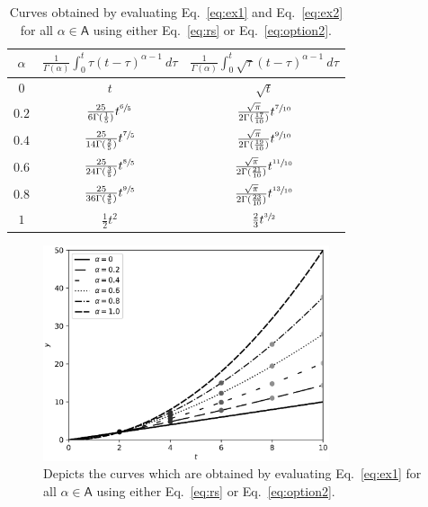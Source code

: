 \documentclass{article}
\theoremstyle{theorem}
\theoremstyle{definition}
\begin{document}
\begin{table}[h!]
\centering
\caption{Curves obtained by evaluating Eq.~\eqref{eq:ex1} and Eq.~\eqref{eq:ex2} for all $\alpha\in \mathsf{A}$ using either Eq.~\eqref{eq:rs} or Eq.~\eqref{eq:option2}.}
\label{tab:eval}
\begin{tabular}{||c|| c| c||} 
 \hline
 $\alpha$ & $\frac{1}{\Gamma(\alpha)}\int_0^t \tau(t-\tau)^{\alpha-1}~d\tau$ & $\frac{1}{\Gamma(\alpha)}\int_0^t \sqrt{\tau}(t-\tau)^{\alpha-1}~d\tau$ \\[0.5ex]
 \hline\hline
 \rule{0pt}{2.5ex}
 $0$ & $t$ & $\sqrt{t}$  \\  
 \rule{0pt}{2.5ex}
 $0.2$ & $\frac{25}{6\Gamma(\frac{1}{5})} t^{\sfrac{6}{5}}$  & $\frac{\sqrt{\pi}}{2\Gamma(\frac{17}{10})} t^{\sfrac{7}{10}}$  \\ 
 \rule{0pt}{2.5ex}
 $0.4$ & $\frac{25}{14\Gamma(\frac{2}{5})} t^{\sfrac{7}{5}}$  & $\frac{\sqrt{\pi}}{2\Gamma(\frac{19}{10})} t^{\sfrac{9}{10}}$  \\
 \rule{0pt}{2.5ex}
 $0.6$ & $\frac{25}{24\Gamma(\frac{3}{5})} t^{\sfrac{8}{5}}$  & $\frac{\sqrt{\pi}}{2\Gamma(\frac{21}{10})} t^{\sfrac{11}{10}}$  \\ 
 \rule{0pt}{2.5ex}
 $0.8$ & $\frac{25}{36\Gamma(\frac{4}{5})} t^{\sfrac{9}{5}}$  & $\frac{\sqrt{\pi}}{2\Gamma(\frac{23}{10})} t^{\sfrac{13}{10}}$  \\ 
 \rule{0pt}{2.5ex}
 $1$ & $\frac{1}{2}t^2$  & $\frac{2}{3}t^{\sfrac{3}{2}}$  \\ [1ex]
 \hline
 \end{tabular}
\end{table}

\begin{figure}[htb]
\centering
\includegraphics[width=0.75\textwidth]{func_eval1.eps}
\caption{Depicts the curves which are obtained by evaluating Eq.~\eqref{eq:ex1} for all $\alpha\in \mathsf{A}$ using either Eq.~\eqref{eq:rs} or Eq.~\eqref{eq:option2}.}
\label{fig:eval1}
\end{figure}
\end{document}
